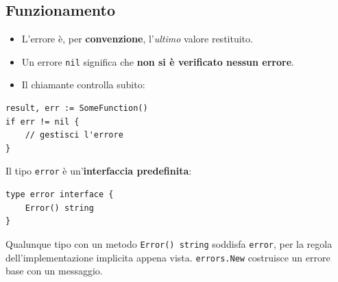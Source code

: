 \documentclass[11pt,a4paper]{report}
\newcommand{\cod}[1]{\texttt{#1}}
\begin{document}
\subsection{Funzionamento}

\begin{itemize}
  \item L'errore è, per \textbf{convenzione}, l'\emph{ultimo} valore restituito.
  \item Un errore \cod{nil} significa che \textbf{non si è verificato nessun errore}.
  \item Il chiamante controlla subito:
\end{itemize}

\begin{lstlisting}[style=gocode,numbers=none]
result, err := SomeFunction()
if err != nil {
	// gestisci l'errore
}
\end{lstlisting}

Il tipo \cod{error} è un'\textbf{interfaccia predefinita}:

\begin{lstlisting}[style=gocode,numbers=none]
type error interface {
	Error() string
}
\end{lstlisting}

Qualunque tipo con un metodo \cod{Error() string} soddisfa \cod{error}, per la
regola dell'implementazione implicita appena vista. \cod{errors.New} costruisce
un errore base con un messaggio.
\end{document}

